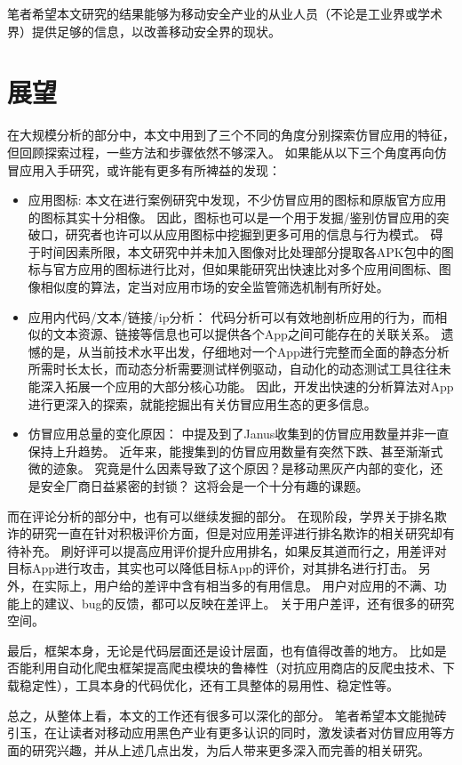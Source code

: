笔者希望本文研究的结果能够为移动安全产业的从业人员（不论是工业界或学术界）提供足够的信息，以改善移动安全界的现状。

\section{展望}

在大规模分析的部分中，本文中用到了三个不同的角度分别探索仿冒应用的特征，但回顾探索过程，一些方法和步骤依然不够深入。
如果能从以下三个角度再向仿冒应用入手研究，或许能有更多有所裨益的发现：

\begin{itemize}
    \item 应用图标:
    本文在进行案例研究中发现，不少仿冒应用的图标和原版官方应用的图标其实十分相像。
    因此，图标也可以是一个用于发掘/鉴别仿冒应用的突破口，研究者也许可以从应用图标中挖掘到更多可用的信息与行为模式。
    碍于时间因素所限，本文研究中并未加入图像对比处理部分提取各APK包中的图标与官方应用的图标进行比对，但如果能研究出快速比对多个应用间图标、图像相似度的算法，定当对应用市场的安全监管筛选机制有所好处。

    \item 应用内代码/文本/链接/ip分析：
    代码分析可以有效地剖析应用的行为，而相似的文本资源、链接等信息也可以提供各个App之间可能存在的关联关系。
    遗憾的是，从当前技术水平出发，仔细地对一个App进行完整而全面的静态分析所需时长太长，而动态分析需要测试样例驱动，自动化的动态测试工具往往未能深入拓展一个应用的大部分核心功能。
    因此，开发出快速的分析算法对App进行更深入的探索，就能挖掘出有关仿冒应用生态的更多信息。

    \item 仿冒应用总量的变化原因：
    中提及到了Janus收集到的仿冒应用数量并非一直保持上升趋势。
    近年来，能搜集到的仿冒应用数量有突然下跌、甚至渐渐式微的迹象。
    究竟是什么因素导致了这个原因？是移动黑灰产内部的变化，还是安全厂商日益紧密的封锁？
    这将会是一个十分有趣的课题。
\end{itemize}

而在评论分析的部分中，也有可以继续发掘的部分。
在现阶段，学界关于排名欺诈的研究一直在针对积极评价方面，但是对应用差评进行排名欺诈的相关研究却有待补充。
刷好评可以提高应用评价提升应用排名，如果反其道而行之，用差评对目标App进行攻击，其实也可以降低目标App的评价，对其排名进行打击。
另外，在实际上，用户给的差评中含有相当多的有用信息。
用户对应用的不满、功能上的建议、bug的反馈，都可以反映在差评上。
关于用户差评，还有很多的研究空间。

最后，\mytool 框架本身，无论是代码层面还是设计层面，也有值得改善的地方。
比如是否能利用自动化爬虫框架提高爬虫模块的鲁棒性（对抗应用商店的反爬虫技术、下载稳定性），工具本身的代码优化，还有工具整体的易用性、稳定性等。

总之，从整体上看，本文的工作还有很多可以深化的部分。
笔者希望本文能抛砖引玉，在让读者对移动应用黑色产业有更多认识的同时，激发读者对仿冒应用等方面的研究兴趣，并从上述几点出发，为后人带来更多深入而完善的相关研究。
